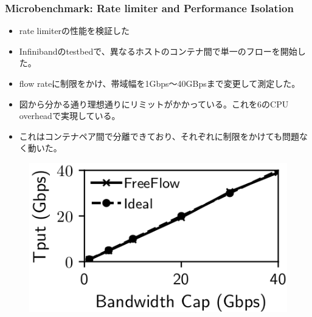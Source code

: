 \documentclass[dvipdfmx,9pt,notheorems]{beamer}
\theoremstyle{definition}
\begin{document}
\begin{frame}\frametitle{Microbenchmark: Rate limiter and Performance Isolation}
	\begin{itemize}
		\item rate limiterの性能を検証した
		\item Infinibandのtestbedで、異なるホストのコンテナ間で単一のフローを開始した。
		\item flow rateに制限をかけ、帯域幅を1Gbps〜40GBpsまで変更して測定した。
		\item 図から分かる通り理想通りにリミットがかかっている。これを6のCPU overheadで実現している。
		\item これはコンテナペア間で分離できており、それぞれに制限をかけても問題なく動いた。
	\end{itemize}
  \begin{figure}[htb]
    \centering
		\includegraphics[scale=1]{fig/figure13.png}
  \end{figure}
\end{frame}
\end{document}
